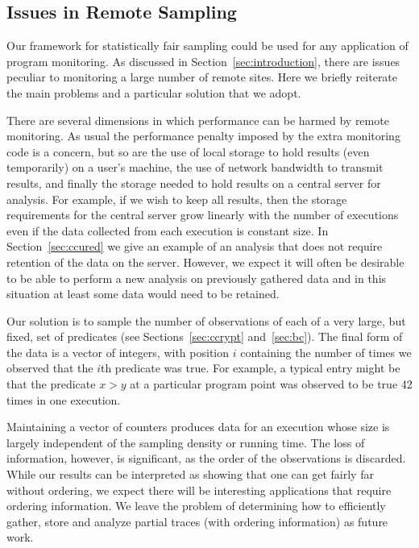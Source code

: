\subsection{Issues in Remote Sampling}
\label{sec-compression}

Our framework for statistically fair sampling could be used for any
application of program monitoring.  As discussed in
Section~\ref{sec:introduction}, there are issues peculiar to
monitoring a large number of remote sites.  Here we briefly reiterate
the main problems and a particular solution that we adopt.

There are several dimensions in which performance can be harmed by
remote monitoring.  As usual the performance penalty imposed by the
extra monitoring code is a concern, but so are the use of local
storage to hold results (even temporarily) on a user's machine, the
use of network bandwidth to transmit results, and finally the storage
needed to hold results on a central server for analysis.  For example,
if we wish to keep all results, then the storage requirements for the
central server grow linearly with the number of executions even if the
data collected from each execution is constant size.  In
Section~\ref{sec:ccured} we give an example of an analysis that does
not require retention of the data on the server.  However, we expect
it will often be desirable to be able to perform a new analysis on
previously gathered data and in this situation at least some data
would need to be retained.

Our solution is to sample the number of observations of each of a very
large, but fixed, set of predicates (see Sections~\ref{sec:ccrypt}
and~\ref{sec:bc}).  The final form of the data is a vector of
integers, with position $i$ containing the number of times we observed
that the $i$th predicate was true.  For example, a typical entry might
be that the predicate $x > y$ at a particular program point was
observed to be true 42 times in one execution.

Maintaining a vector of counters produces data for an execution whose
size is largely independent of the sampling density or running time.
The loss of information, however, is significant, as the order
of the observations is discarded.  While our results can be interpreted
as showing that one can get fairly far without ordering, we expect
there will be interesting applications that require ordering information.
We leave the problem of determining how to efficiently gather, store and
analyze partial traces (with ordering information) as future work.
